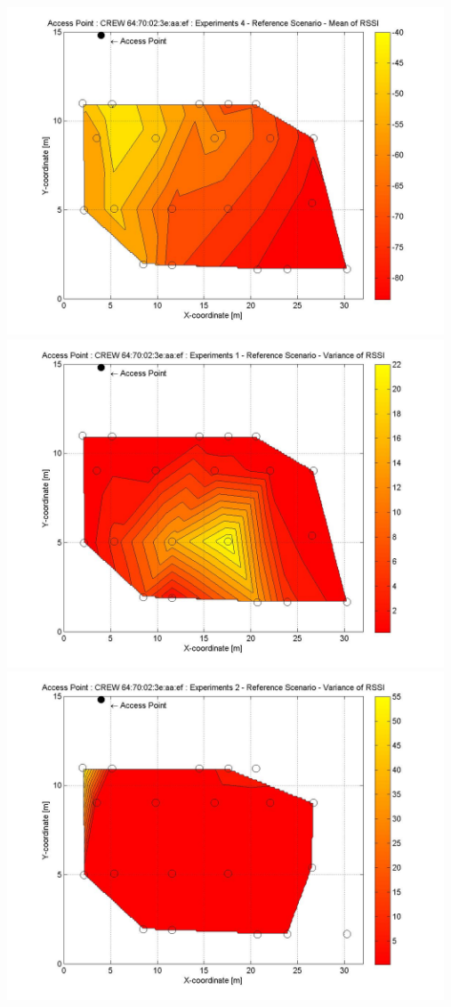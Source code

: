\documentclass[11pt,a4paper,headinclude,footinclude,chapterprefix=on]{scrreprt}
\begin{document}
\begin{longtable}
	\includegraphics[width=13cm]{../../Source/plot/CREW_ef/ef_Ref_Ex_4_Mean.jpg} \\
	\includegraphics[width=13cm]{../../Source/plot/CREW_ef/ef_Ref_Ex_1_Variance.jpg} \\
	\includegraphics[width=13cm]{../../Source/plot/CREW_ef/ef_Ref_Ex_2_Variance.jpg} \\

\end{longtable}
\end{document}
